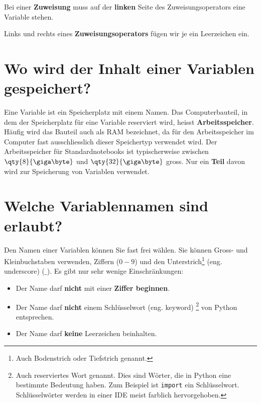 \begin{important}
	Bei einer \textbf{Zuweisung} muss auf der \textbf{linken} Seite des Zuweisungsoperators eine Variable stehen.  
\end{important}

\begin{cleancode}[Leerzeichen 1]
Links und rechts eines \textbf{Zuweisungsoperators} fügen wir je ein Leerzeichen ein.
\end{cleancode}

\section{Wo wird der Inhalt einer Variablen gespeichert?}

Eine Variable ist ein Speicherplatz mit einem Namen. Das Computerbauteil, in dem der Speicherplatz für eine Variable reserviert wird, heisst \textbf{Arbeitsspeicher}. Häufig wird das Bauteil auch als \ac{RAM} bezeichnet, da für den Arbeitsspeicher im Computer fast ausschliesslich dieser Speichertyp verwendet wird. Der Arbeitsspeicher für Standardnotebooks ist typischerweise zwischen $\qty{8}{\giga\byte}$ und $\qty{32}{\giga\byte}$ gross. Nur ein \textbf{Teil} davon wird zur Speicherung von Variablen verwendet. 

\section{Welche Variablennamen sind erlaubt?}

Den Namen einer Variablen können Sie fast frei wählen. Sie können Gross- und Kleinbuchstaben verwenden, Ziffern ($0-9$) und den Unterstrich\footnote{Auch Bodenstrich oder Tiefstrich genannt.} (eng. underscore) ($\_$). Es gibt nur sehr wenige Einschränkungen:

\begin{itemize}
\item Der Name darf \textbf{nicht} mit einer \textbf{Ziffer beginnen}.
\item Der Name darf \textbf{nicht} einem Schlüsselwort (eng. keyword) \footnote{Auch reserviertes Wort genannt. Dies sind Wörter, die in Python eine bestimmte Bedeutung haben. Zum Beispiel ist \lstinline{import} ein Schlüsselwort. Schlüsselwörter werden in einer \ac{IDE} meist farblich hervorgehoben.} von Python entsprechen.
\item Der Name darf \textbf{keine} Leerzeichen beinhalten.
\end{itemize}

